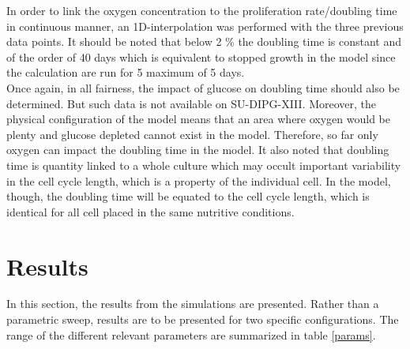 \documentclass[11pt,a4paper]{article}
\begin{document}
In order to link the oxygen concentration to the proliferation rate/doubling time in continuous manner, an 1D-interpolation was performed  with the three previous data points. It should be noted that below 2 \% the doubling time is constant and of the order of 40 days which is equivalent to stopped growth in the model since the calculation are run for 5 maximum of 5 days.\\

Once again, in all fairness, the impact of glucose on doubling time should also be determined. But such data is not available on SU-DIPG-XIII. Moreover, the physical configuration of the model means that an area where oxygen would be plenty and glucose depleted cannot exist in the model. Therefore, so far only oxygen can impact the doubling time in the model. It also noted that doubling time is quantity linked to a whole culture which may occult important variability in the cell cycle length, which is a property of the individual cell. In the model, though, the doubling time will be equated to the cell cycle length, which is identical for all cell placed in the same nutritive conditions.


\section{Results}
In this section, the results from the simulations are presented. Rather than a parametric sweep, results are to be presented for two specific configurations. The range of the different relevant parameters are summarized in table \ref{params}.\\
\end{document}
